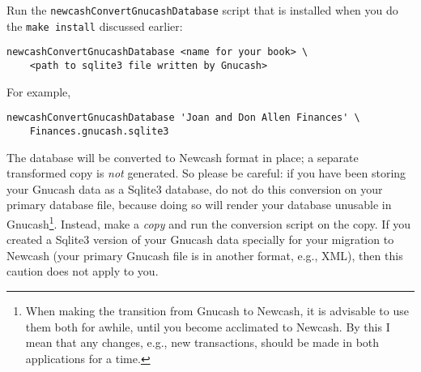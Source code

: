 \documentclass{report}
\begin{document}
Run the \verb|newcashConvertGnucashDatabase| script that is installed when you do the \verb|make install| discussed earlier:
\begin{verbatim}
newcashConvertGnucashDatabase <name for your book> \
    <path to sqlite3 file written by Gnucash>
\end{verbatim}

For example, 
\begin{verbatim}
newcashConvertGnucashDatabase 'Joan and Don Allen Finances' \
    Finances.gnucash.sqlite3
\end{verbatim}

The database will be converted to Newcash format in place; a separate transformed copy is \emph{not} generated. So please be careful: if you have been storing your Gnucash data as a Sqlite3 database, do not do this conversion on your primary database file, because doing so will render your database unusable in Gnucash\footnote{When making the transition from Gnucash to Newcash, it is advisable to use them both for awhile, until you become acclimated to Newcash. By this I mean that any changes, e.g., new transactions, should be made in both applications for a time.}. Instead, make a \emph{copy} and run the conversion script on the copy. If you created a Sqlite3 version of your Gnucash data specially for your migration to Newcash (your primary Gnucash file is in another format, e.g., XML), then this caution does not apply to you.
\end{document}

